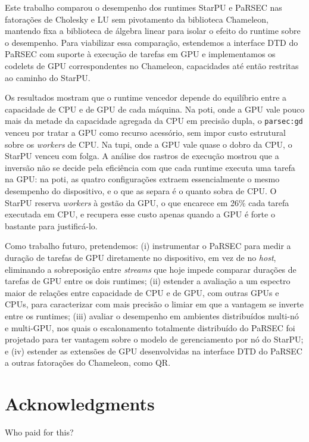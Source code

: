 \documentclass[12pt]{article}
\begin{document}
Este trabalho comparou o desempenho dos runtimes StarPU e PaRSEC nas fatorações de Cholesky e LU sem pivotamento da biblioteca Chameleon, mantendo fixa a biblioteca de álgebra linear para isolar o efeito do runtime sobre o desempenho. Para viabilizar essa comparação, estendemos a interface DTD do PaRSEC com suporte à execução de tarefas em GPU e implementamos os codelets de GPU correspondentes no Chameleon, capacidades até então restritas ao caminho do StarPU.

Os resultados mostram que o runtime vencedor depende do equilíbrio entre a
capacidade de CPU e de GPU de cada máquina. Na poti, onde a GPU vale pouco mais
da metade da capacidade agregada da CPU em precisão dupla, o \texttt{parsec:gd} venceu
por tratar a GPU como recurso acessório, sem impor custo estrutural sobre os
\emph{workers} de CPU. Na tupi, onde a GPU vale quase o dobro da CPU, o StarPU venceu
com folga. A análise dos rastros de execução mostrou que a inversão não se decide
pela eficiência com que cada runtime executa uma tarefa na GPU: na poti, as
quatro configurações extraem essencialmente o mesmo desempenho do dispositivo, e
o que as separa é o quanto sobra de CPU. O StarPU reserva \emph{workers} à gestão da
GPU, o que encarece em 26\% cada tarefa executada em CPU, e recupera esse custo
apenas quando a GPU é forte o bastante para justificá-lo.

Como trabalho futuro, pretendemos: (i) instrumentar o PaRSEC para medir a
duração de tarefas de GPU diretamente no dispositivo, em vez de no \emph{host},
eliminando a sobreposição entre \emph{streams} que hoje impede comparar durações de
tarefas de GPU entre os dois runtimes; (ii) estender a avaliação a um espectro
maior de relações entre capacidade de CPU e de GPU, com outras GPUs e CPUs, para
caracterizar com mais precisão o limiar em que a vantagem se inverte entre os
runtimes; (iii) avaliar o desempenho em ambientes distribuídos multi-nó e
multi-GPU, nos quais o escalonamento totalmente distribuído do PaRSEC foi
projetado para ter vantagem sobre o modelo de gerenciamento por nó do StarPU; e
(iv) estender as extensões de GPU desenvolvidas na interface DTD do PaRSEC a
outras fatorações do Chameleon, como QR.
\section*{Acknowledgments}
\label{sec:org24fff15}
Who paid for this?


\end{document}
